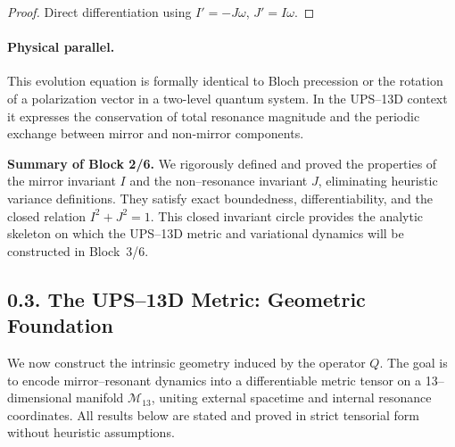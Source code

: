 \begin{proof}
Direct differentiation using $I'=-J\omega$, $J'=I\omega$.
\end{proof}

\paragraph{Physical parallel.}
This evolution equation is formally identical to Bloch precession or the rotation of a polarization vector in a two-level quantum system.
In the UPS–13D context it expresses the conservation of total resonance magnitude and the periodic exchange between mirror and non-mirror components.


\noindent\textbf{Summary of Block 2/6.}
We rigorously defined and proved the properties of the mirror invariant $I$ and the non–resonance invariant $J$,
eliminating heuristic variance definitions.
They satisfy exact boundedness, differentiability, and the closed relation $I^2+J^2=1$.
This closed invariant circle provides the analytic skeleton on which the UPS–13D metric and variational dynamics will be constructed in Block~3/6.



\subsection*{0.3. The UPS–13D Metric: Geometric Foundation}

\noindent
We now construct the intrinsic geometry induced by the operator $Q$.
The goal is to encode mirror–resonant dynamics into a differentiable metric tensor on a 13–dimensional manifold $\mathcal{M}_{13}$,
uniting external spacetime and internal resonance coordinates.
All results below are stated and proved in strict tensorial form without heuristic assumptions.

